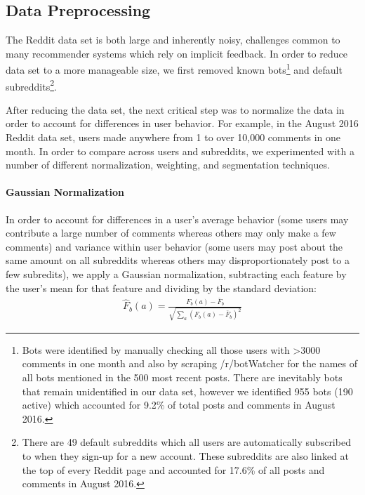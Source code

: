 \documentclass{article}
\begin{document}
\subsection{Data Preprocessing}\label{sec:data-prepros}
The Reddit data set is both large and inherently noisy, challenges common to many recommender systems which rely on implicit feedback.  In order to reduce data set to a more manageable size, we first removed known bots\footnote{Bots were identified by manually checking all those users with >3000 comments in one month and also by scraping /r/botWatcher for the names of all bots mentioned in the 500 most recent posts.  There are inevitably bots that remain unidentified in our data set, however we identified 955 bots (190 active) which accounted for 9.2\% of total posts and comments in August 2016.} and default subreddits\footnote{There are 49 default subreddits which all users are automatically subscribed to when they sign-up for a new account.  These subreddits are also linked at the top of every Reddit page and accounted for 17.6\% of all posts and comments in August 2016.}.  

After reducing the data set, the next critical step was to normalize the data in order to account for differences in user behavior.  For example, in the August 2016 Reddit data set, users made anywhere from 1 to over 10,000 comments in one month.  In order to compare across users and subreddits, we experimented with a number of different normalization, weighting, and segmentation techniques.

\paragraph{Gaussian Normalization} In order to account for differences in a user's average behavior (some users may contribute a large number of comments whereas others may only make a few comments) and variance within user behavior (some users may post about the same amount on all subreddits whereas others may disproportionately post to a few subredits), we apply a Gaussian normalization, subtracting each feature by the user's mean for that feature and dividing by the standard deviation: \begin{align*}
\hat{F}_{b}(a) = \frac{F_{b}(a) - \bar{F}_b}{\sqrt{\sum_{a}{(F_{b}(a) - \bar{F}_b)^2}}}
\end{align*}
\end{document}
